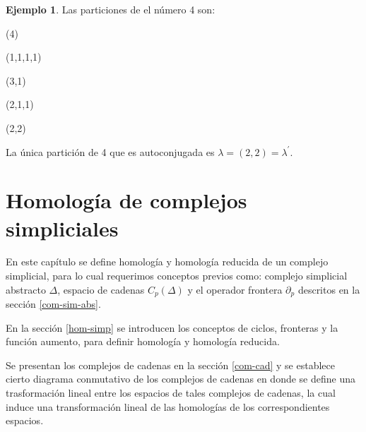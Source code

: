 \documentclass[12pt]{book}
\theoremstyle{definition}
\newtheorem{example}[theorem]{Ejemplo}
\newcounter{in}
\newcounter{ini}
\begin{document}
\begin{example}Las particiones de el número 4 son:
  \begin{center}
    \begin{minipage}[h]{0.2\linewidth}
      \centering {}

      (4)
    \end{minipage}
    \begin{minipage}[h]{0.15\linewidth}
      \centering {}

      (1,1,1,1)
    \end{minipage}
    \begin{minipage}[h]{0.2\linewidth}
      \centering {}
      
      (3,1)
    \end{minipage}
    \begin{minipage}[h]{0.2\linewidth}
      \centering {}
      
      (2,1,1)
    \end{minipage}
    \begin{minipage}[h]{0.2\linewidth}
      \centering {}
      
      (2,2)
    \end{minipage}
  \end{center}
 La única partición de 4 que es autoconjugada es $\lambda=(2,2)=\lambda^{'}$.
\end{example}

\chapter{Homología de complejos simpliciales}
\label{cha:hom-com-sim}

En este capítulo se define homología  y homología reducida de un
complejo simplicial, para lo cual requerimos conceptos previos como:
complejo simplicial abstracto $\Delta$, espacio de cadenas $C_{p}(\Delta)$ y el
operador frontera $\partial_{p}$ descritos en la sección
\ref{com-sim-abs}. 

En la sección \ref{hom-simp} se introducen los conceptos de ciclos, fronteras y la
función aumento, para definir homología y homología reducida.

Se presentan los complejos de cadenas en la sección \ref{com-cad} y se
establece cierto diagrama conmutativo de los complejos de cadenas en donde
se define una trasformación lineal entre los espacios de tales
complejos de cadenas, la cual induce una transformación lineal de las homologías
de los correspondientes espacios.
\end{document}
